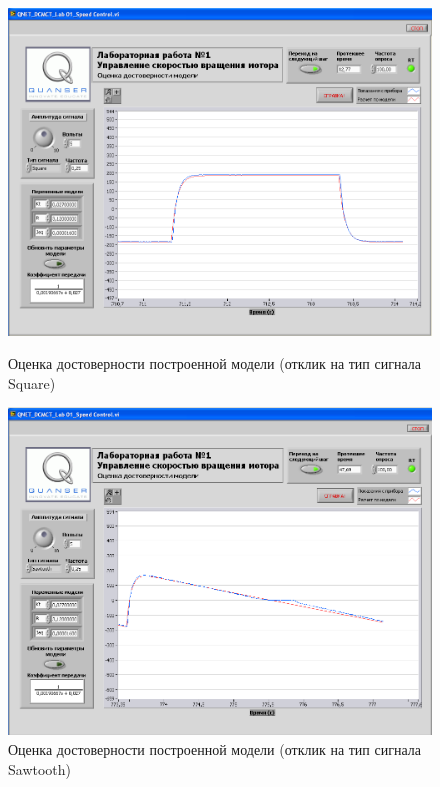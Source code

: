 \documentclass[12pt]{article}
\begin{document}
\begin{center}
	\begin{figure}
		\centering
		\includegraphics[scale=1.6]{square}
		\caption{Оценка достоверности построенной модели (отклик на тип сигнала Square)}
		\centering
		\includegraphics[scale=1.6]{sawtooth}
		\caption{Оценка достоверности построенной модели (отклик на тип сигнала Sawtooth)}
		\end{figure}
\end{center}
\end{document}
